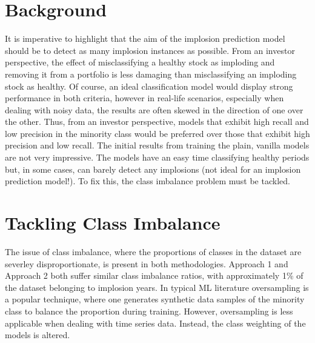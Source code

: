 \documentclass[a4paper]{report}
\begin{document}
\section{Background}
It is imperative to highlight that the aim of the implosion prediction model should be to detect as many implosion instances as possible. From an investor perspective, the effect of misclassifying a healthy stock as imploding and removing it from a portfolio
is less damaging than misclassifying an imploding stock as healthy. Of course, an ideal classification model would display strong performance in both criteria, however in 
real-life scenarios, especially when dealing with noisy data, the results are often skewed in the direction of one over the other. Thus, from an investor perspective, models that exhibit high recall and low precision in the minority class would be preferred 
over those that exhibit high precision and low recall. The initial results from training the plain, vanilla models are not very impressive. 
The models have an easy time classifying healthy periods but, in some cases, can barely detect any implosions (not ideal for an implosion prediction model!). To fix this, the class imbalance problem must be tackled.


\section{Tackling Class Imbalance}
The issue of class imbalance, where the proportions of classes in the dataset are severley disproportionate, is present in both methodologies. Approach 1 and 
Approach 2 both suffer similar class imbalance ratios, with approximately 1\% of the dataset belonging to implosion years. In typical ML literature oversampling is a popular 
technique, where one generates synthetic data samples of the minority class to balance the proportion during training. However, oversampling is less applicable when dealing with 
time series data. Instead, the class weighting of the models is altered. 
\end{document}
